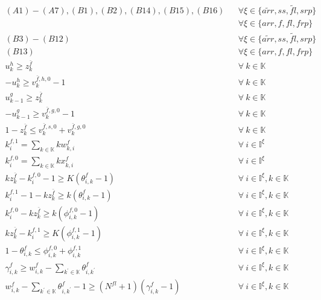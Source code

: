\documentclass[]{interact}
\theoremstyle{plain}%
\theoremstyle{definition}
\theoremstyle{remark}
\begin{document}
\begin{eqnarray}
(A1)-(A7),(B1),(B2),(B14),(B15),(B16)&& \forall \xi \in\{\tilde{arr},ss,\tilde{fl},srp\}\nonumber\\
&&  \forall\xi \in\{arr,f,fl,frp\}\nonumber\\
(B3)-(B12)&& \forall \xi \in\{\tilde{arr},ss,\tilde{fl},srp\}\nonumber\\
(B13)&& \forall\xi \in\{arr,f,fl,frp\}\nonumber\\
u^{h}_k\ge z^{\bar{f}}_k&&\forall\ k\in \mathbb{K}\label{fail:D1}\\
-u^{h}_k\ge v^{\bar{f},h,0}_k-1&&\forall\ k\in \mathbb{K}\label{fail:D2}\\
u^{g}_{k-1}\ge z^{\bar{f}}_k &&\forall\ k\in \mathbb{K}\label{fail:D3}\\
-u^{g}_{k-1} \ge v^{\bar{f},g,0}_k-1&&\forall\ k\in \mathbb{K}\label{fail:D4}\\
1-z^{\bar{f}}_k\le v^{\bar{f},s,0}_k+v^{\bar{f},g,0}_k&&\forall\ k\in \mathbb{K}\label{fail:D5}\\
k^{f,1}_i=\sum_{k\in\mathbb{K}}kw^{f}_{k,i}&&\forall\ i\in \mathbb{I}^{\xi}\label{fail:D6}\\
k^{f,0}_i=\sum_{k\in\mathbb{K}}kx^{f}_{k,i}&&\forall\ i\in \mathbb{I}^{\xi}\label{fail:D7}\\
kz^{\bar{f}}_k -k^{f,0}_i - 1 \ge K(\theta^{f}_{i,k}-1)&&\forall\ i\in \mathbb{I}^{\xi},k\in \mathbb{K}\label{fail:D8}\\
k^{f,1}_i - 1 - kz^{\bar{f}}_k \ge k(\theta^{f}_{i,k}-1)&&\forall\  i\in \mathbb{I}^{\xi},k\in \mathbb{K}\label{fail:D9}\\
k^{f,0}_i - kz^{\bar{f}}_k \ge k(\phi^{f,0}_{i,k}-1)&&\forall\ i\in \mathbb{I}^{\xi},k\in \mathbb{K}\label{fail:D10}\\
kz^{\bar{f}}_k - k^{f,1}_i \ge K(\phi^{f,1}_{i,k}-1)&&\forall\ i\in \mathbb{I}^{\xi},k\in \mathbb{K}\label{fail:D11}\\
1-\theta^{f}_{i,k} \le \phi^{f,0}_{i,k} + \phi^{f,1}_{i,k}&&\forall\ i\in \mathbb{I}^{\xi},k\in \mathbb{K}\label{fail:D12}\\
\gamma^{f}_{i,k} \ge w^{f}_{i,k} - \sum_{k^{'}\in \mathbb{K}}\theta^{f}_{i,k^{'}}&&\forall\ i\in \mathbb{I}^{\xi},k\in \mathbb{K}\label{fail:D13}\\
w^{f}_{i,k} - \sum_{k^{'}\in \mathbb{K}}\theta^{f}_{i,k^{'}} -1 \ge (N^{fl}+1)(\gamma^{f}_{i,k}-1) &&\forall\ i\in \mathbb{I}^{\xi},k\in \mathbb{K}\label{fail:D14}
\end{eqnarray}
\end{document}
